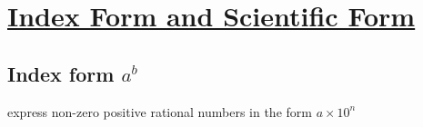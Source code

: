 


\chapter{\protect\hyperlink{chap:\thechapter}{Index Form and Scientific Form}}


\section{Index form $a^b$}

express non-zero positive rational
numbers in the form
$a\times 10^n$